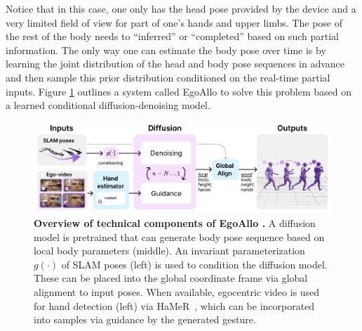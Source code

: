 \documentclass[../../book-main.tex]{subfiles}
\begin{document}
Notice that in this case, one only has the head pose  provided by the device and a very limited field of view for part of one's hands and upper limbs. The pose of the rest of the body needs to ``inferred'' or ``completed'' based on such partial information. The only way one can estimate the body pose over time is by learning the joint distribution of the head and body pose sequences in advance and then sample this prior distribution conditioned on the real-time partial inputs. Figure \ref{fig:pose-method} outlines a system called EgoAllo \cite{yi2024egoallo} to solve this problem based on a learned conditional diffusion-denoising model. 
\begin{figure}[t]
  \centering
  \includegraphics[width=\linewidth]{figs_chap6/pose-method.pdf}
\caption{
    \textbf{Overview of technical components of EgoAllo \cite{yi2024egoallo}.}
    A diffusion model is pretrained that can generate body pose sequence based on local body parameters (middle).
    An invariant parameterization $g(\cdot)$ of SLAM poses (left) is used to condition the diffusion model. These can be placed into the global coordinate frame via global alignment to input poses.
    When available, egocentric video is used for hand detection (left) via HaMeR~\cite{pavlakos2023reconstructing}, which can be incorporated into samples via guidance by the generated gesture.
  }
  \label{fig:pose-method}
\end{figure}
\end{document}
